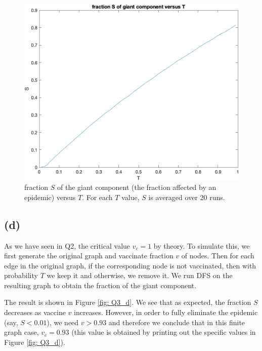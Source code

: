 \documentclass{article}
\begin{document}
\begin{figure}[htp]
	\centering
	\includegraphics[width=.8\linewidth]{figs/Q3_c.png}
	\caption{fraction $ S $ of the giant component (the fraction affected by an epidemic) versus $ T $. For each $ T $ value, $ S $ is averaged over 20 runs.}
	\label{fig: Q3_c}
\end{figure}

\subsection*{(d)}
As we have seen in Q2, the critical value $ v_c = 1 $ by theory. To simulate this, we first generate the original graph and vaccinate fraction $ v $ of nodes. Then for each edge in the original graph, if the corresponding node is not vaccinated, then with probability $ T $ we keep it and otherwise, we remove it. We run DFS on the resulting graph to obtain the fraction of the giant component.

The result is shown in Figure \ref{fig: Q3_d}. We see that as expected, the fraction $ S $ decreases as vaccine $ v $ increases. However, in order to fully eliminate the epidemic (say, $ S < 0.01 $), we need $ v >  0.93 $ and therefore we conclude that in this finite graph case, $ v_c = 0.93 $ (this value is obtained by printing out the specific values in Figure \ref{fig: Q3_d}).
\end{document}
